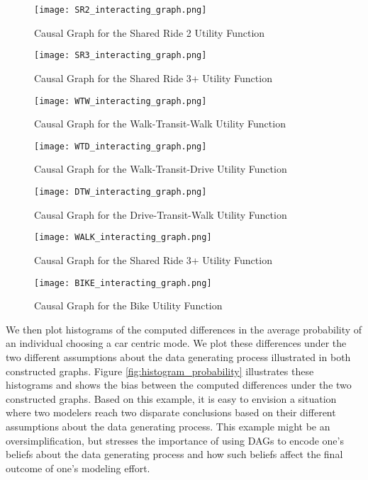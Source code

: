 \begin{figure}
   \centering
   \texttt{[image: SR2\_interacting\_graph.png]}
   \caption{Causal Graph for the Shared Ride 2 Utility Function}
   \label{fig:SR2_causal_2}
\end{figure}

\begin{figure}
   \centering
   \texttt{[image: SR3\_interacting\_graph.png]}
   \caption{Causal Graph for the Shared Ride 3+ Utility Function}
   \label{fig:SR3_causal_2}
\end{figure}

\begin{figure}
   \centering
   \texttt{[image: WTW\_interacting\_graph.png]}
   \caption{Causal Graph for the Walk-Transit-Walk Utility Function}
   \label{fig:WTW_causal_2}
\end{figure}

\begin{figure}
   \centering
   \texttt{[image: WTD\_interacting\_graph.png]}
   \caption{Causal Graph for the Walk-Transit-Drive Utility Function}
   \label{fig:WTD_causal_2}
\end{figure}

\begin{figure}
   \centering
   \texttt{[image: DTW\_interacting\_graph.png]}
   \caption{Causal Graph for the Drive-Transit-Walk Utility Function}
   \label{fig:DTW_causal_2}
\end{figure}

\begin{figure}
   \centering
   \texttt{[image: WALK\_interacting\_graph.png]}
   \caption{Causal Graph for the Shared Ride 3+ Utility Function}
   \label{fig:WALK_causal_2}
\end{figure}

\begin{figure}
   \centering
   \texttt{[image: BIKE\_interacting\_graph.png]}
   \caption{Causal Graph for the Bike Utility Function}
   \label{fig:BIKE_causal_2}
\end{figure}

We then plot histograms of the computed differences in the average probability of an individual choosing a car centric mode.
We plot these differences under the two different assumptions about the data generating process illustrated in both constructed graphs.
Figure \ref{fig:histogram_probability} illustrates these histograms and shows the bias between the computed differences under the two constructed graphs.
Based on this example, it is easy to envision a situation where two modelers reach two disparate conclusions based on their different assumptions about the data generating process. 
This example might be an oversimplification, but stresses the importance of using DAGs to encode one's beliefs about the data generating process and how such beliefs affect the final outcome of one's modeling effort.

